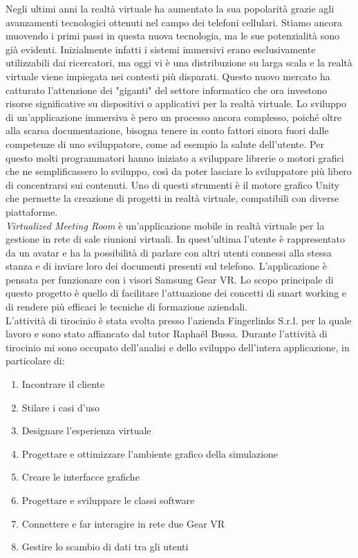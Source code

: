 Negli ultimi anni la realtà virtuale ha aumentato la sua popolarità grazie agli avanzamenti tecnologici ottenuti nel campo dei telefoni cellulari. Stiamo ancora muovendo i primi passi in questa nuova tecnologia, ma le sue potenzialità sono già evidenti. Inizialmente infatti i sistemi immersivi erano esclusivamente utilizzabili dai ricercatori, ma oggi vi è una distribuzione su larga scala e la realtà virtuale viene impiegata nei contesti più disparati. Questo nuovo mercato ha catturato l'attenzione dei "giganti" del settore informatico che ora investono risorse significative su dispositivi o applicativi per la realtà virtuale.
Lo sviluppo di un'applicazione immersiva è pero un processo ancora complesso, poiché oltre alla scarsa documentazione, bisogna tenere in conto fattori sinora fuori dalle competenze di uno sviluppatore, come ad esempio la salute dell'utente. Per questo molti programmatori hanno iniziato a sviluppare librerie o motori grafici che ne semplificassero lo sviluppo, così da poter lasciare lo sviluppatore più libero di concentrarsi sui contenuti. Uno di questi strumenti è il motore grafico Unity che permette la creazione di progetti in realtà virtuale, compatibili con diverse piattaforme. \\
\textit{Virtualized Meeting Room} è un'applicazione mobile in realtà virtuale per la gestione in rete di sale riunioni virtuali. In quest'ultima l'utente è rappresentato da un avatar e ha la possibilità di parlare con altri utenti connessi alla stessa stanza e di inviare loro dei documenti presenti sul telefono. L'applicazione è pensata per funzionare con i visori Samsung Gear VR. Lo scopo principale di questo progetto è quello di facilitare l'attuazione dei concetti di smart working e di rendere più efficaci le tecniche di formazione aziendali. \\
\newpage
L'attività di tirocinio è stata svolta presso l'azienda Fingerlinks S.r.l. per la quale lavoro e sono stato affiancato dal tutor Raphaël Bussa.
Durante l'attività di tirocinio mi sono occupato dell'analisi e dello sviluppo dell'intera applicazione, in particolare di:
\begin{enumerate}
	\item Incontrare il cliente
	\item Stilare i casi d'uso
	\item Designare l'esperienza virtuale
	\item Progettare e ottimizzare l'ambiente grafico della simulazione
	\item Creare le interfacce grafiche
	\item Progettare e sviluppare le classi software
	\item Connettere e far interagire in rete due Gear VR
	\item Gestire lo scambio di dati tra gli utenti
\end{enumerate}

